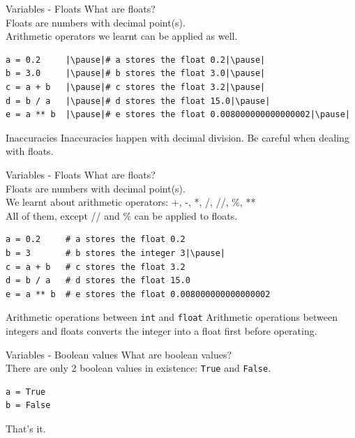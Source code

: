 \documentclass[dvipsnames, svgnames, x11names]{beamer}
\begin{document}
\begin{frame}[fragile]{Variables - Floats}
What are floats?\pause\\
Floats are numbers with decimal point(s).\pause\\
Arithmetic operators we learnt can be applied as well.
\begin{verbatim}
a = 0.2     |\pause|# a stores the float 0.2|\pause|
b = 3.0     |\pause|# b stores the float 3.0|\pause|
c = a + b   |\pause|# c stores the float 3.2|\pause|
d = b / a   |\pause|# d stores the float 15.0|\pause|
e = a ** b  |\pause|# e stores the float 0.008000000000000002|\pause|
\end{verbatim}
\begin{alertblock}{Inaccuracies}
Inaccuracies happen with decimal division. Be careful when dealing with floats.
\end{alertblock}
\end{frame}

\begin{frame}[fragile]{Variables - Floats}
What are floats?\\
Floats are numbers with decimal point(s).\\
We learnt about arithmetic operators: +, -, *, /, //, \%, **\\
All of them, except // and \% can be applied to floats.
\begin{verbatim}
a = 0.2     # a stores the float 0.2
b = 3       # b stores the integer 3|\pause|
c = a + b   # c stores the float 3.2
d = b / a   # d stores the float 15.0
e = a ** b  # e stores the float 0.008000000000000002
\end{verbatim}
\pause
\begin{block}{Arithmetic operations between \texttt{int} and \texttt{float}}
Arithmetic operations between integers and floats converts the integer into a float first before operating.
\end{block}
\end{frame}



\begin{frame}[fragile]{Variables - Boolean values}
What are boolean values?\pause\\
There are only 2 boolean values in existence: \texttt{True} and \texttt{False}.\pause
\begin{verbatim}
a = True
b = False
\end{verbatim}
\vspace{2cm}
\pause That's it.
\end{frame}
\end{document}

